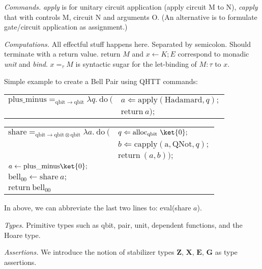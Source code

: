 \documentclass[acmsmall,nonacm,review,timestamp]{acmart}
\newcommand{\Z}{\ensuremath{\mathbf{Z}}\xspace}
\newcommand{\X}{\ensuremath{\mathbf{X}}\xspace}
\newcommand{\E}{\ensuremath{\mathbf{E}}\xspace}
\renewcommand{\G}{\ensuremath{\mathbf{G}}\xspace}
\begin{document}
\textit{Commands.} \textit{apply} is for unitary circuit application (apply circuit M to N), \textit{capply} that with controls M, circuit N and arguments O. (An alternative is to formulate gate/circuit application as assignment.)

\textit{Computations.} All effectful stuff happens here. Separated by semicolon. Should terminate with a return value. return $M$ and $x \gets K; E$ correspond to monadic \textit{unit} and \textit{bind}. $x =_\tau M$ is syntactic sugar for the let-binding of $M:\tau$ to $x$.

Simple example to create a Bell Pair using QHTT commands:

\begin{center}
\begingroup
\setlength{\tabcolsep}{0pt}
\begin{tabular}{ll}

	$\mathrm{plus\_minus} =_{\mathrm{qbit} \to \mathrm{qbit}} \lambda q.\ \mathrm{do}\ ($&$a \Leftarrow \mathrm{apply}(\mathrm{Hadamard}, q);$\\
																																	&$\mathrm{return}\ a);$\\
\end{tabular}

\begin{tabular}{ll}
	$\mathrm{share} =_{\mathrm{qbit} \to \mathrm{qbit} \otimes \mathrm{qbit}} \lambda a.\ \mathrm{do}\ ($&$q \Leftarrow \mathrm{alloc_{qbit}}\ \ket{0};$\\
		&$b \Leftarrow \mathrm{capply}(\mathrm{a, QNot}, q);$\\
		&$\mathrm{return}\ (a, b));$\\
	$a \gets \mathrm{plus\_minus} \ket{0};$ & \\
	$\mathrm{bell_{00}} \gets \mathrm{share}\ a;$ & \\
	$\mathrm{return}\ \mathrm{bell_{00}}$&
\end{tabular}
\endgroup
\end{center}

In above, we can abbreviate the last two lines to: eval(share $a$).

\textit{Types.} Primitive types such as qbit, pair, unit, dependent functions, and the Hoare type.

\textit{Assertions.} We introduce the notion of stabilizer types \Z, \X, \E, \G as type assertions.

\end{document}

